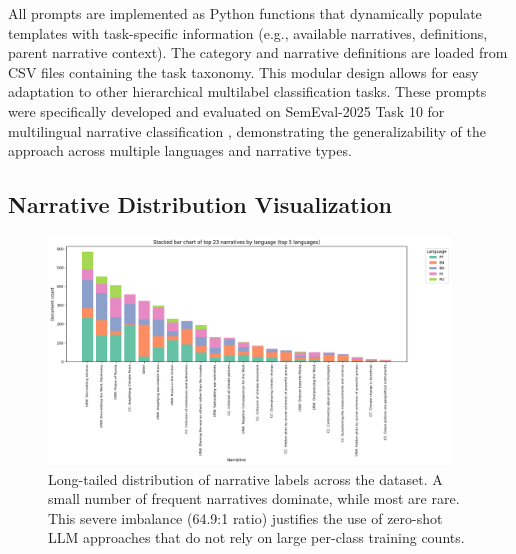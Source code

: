 All prompts are implemented as Python functions that dynamically populate templates with task-specific information (e.g., available narratives, definitions, parent narrative context). The category and narrative definitions are loaded from CSV files containing the task taxonomy. This modular design allows for easy adaptation to other hierarchical multilabel classification tasks. These prompts were specifically developed and evaluated on SemEval-2025 Task 10 for multilingual narrative classification \citep{semeval2025task10}, demonstrating the generalizability of the approach across multiple languages and narrative types.

\subsection{Narrative Distribution Visualization}

\begin{figure}[!ht]
\centering
\includegraphics[width=0.95\textwidth]{assets/images/data_description/narrative_distribution.png}
\caption{Long-tailed distribution of narrative labels across the dataset. A small number of frequent narratives dominate, while most are rare. This severe imbalance (64.9:1 ratio) justifies the use of zero-shot LLM approaches that do not rely on large per-class training counts.}
\label{fig:narrative_distribution}
\end{figure}
